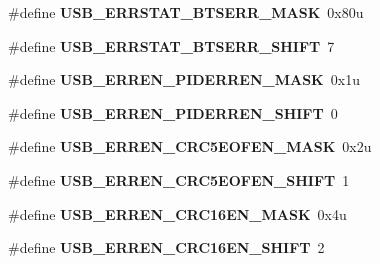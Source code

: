 \begin{DoxyCompactItemize}
\item 
\#define {\bfseries U\+S\+B\+\_\+\+E\+R\+R\+S\+T\+A\+T\+\_\+\+B\+T\+S\+E\+R\+R\+\_\+\+M\+A\+SK}~0x80u\hypertarget{group__USB__Register__Masks_ga9cfa1a07c56005e5d545ecf363c4e916}{}\label{group__USB__Register__Masks_ga9cfa1a07c56005e5d545ecf363c4e916}

\item 
\#define {\bfseries U\+S\+B\+\_\+\+E\+R\+R\+S\+T\+A\+T\+\_\+\+B\+T\+S\+E\+R\+R\+\_\+\+S\+H\+I\+FT}~7\hypertarget{group__USB__Register__Masks_ga4827905bfe176b3ba2992ce3ff9a4575}{}\label{group__USB__Register__Masks_ga4827905bfe176b3ba2992ce3ff9a4575}

\item 
\#define {\bfseries U\+S\+B\+\_\+\+E\+R\+R\+E\+N\+\_\+\+P\+I\+D\+E\+R\+R\+E\+N\+\_\+\+M\+A\+SK}~0x1u\hypertarget{group__USB__Register__Masks_ga971e0d8939196ec3990a73b4db4030ad}{}\label{group__USB__Register__Masks_ga971e0d8939196ec3990a73b4db4030ad}

\item 
\#define {\bfseries U\+S\+B\+\_\+\+E\+R\+R\+E\+N\+\_\+\+P\+I\+D\+E\+R\+R\+E\+N\+\_\+\+S\+H\+I\+FT}~0\hypertarget{group__USB__Register__Masks_ga47a2a895b1b94a32aa482d11173e2fb9}{}\label{group__USB__Register__Masks_ga47a2a895b1b94a32aa482d11173e2fb9}

\item 
\#define {\bfseries U\+S\+B\+\_\+\+E\+R\+R\+E\+N\+\_\+\+C\+R\+C5\+E\+O\+F\+E\+N\+\_\+\+M\+A\+SK}~0x2u\hypertarget{group__USB__Register__Masks_gafab72bb1aedf0d529c720a25d6ee93da}{}\label{group__USB__Register__Masks_gafab72bb1aedf0d529c720a25d6ee93da}

\item 
\#define {\bfseries U\+S\+B\+\_\+\+E\+R\+R\+E\+N\+\_\+\+C\+R\+C5\+E\+O\+F\+E\+N\+\_\+\+S\+H\+I\+FT}~1\hypertarget{group__USB__Register__Masks_gafc8288624f2373be283f408a290f3daf}{}\label{group__USB__Register__Masks_gafc8288624f2373be283f408a290f3daf}

\item 
\#define {\bfseries U\+S\+B\+\_\+\+E\+R\+R\+E\+N\+\_\+\+C\+R\+C16\+E\+N\+\_\+\+M\+A\+SK}~0x4u\hypertarget{group__USB__Register__Masks_gae216c42729f6b3d992001136744fe341}{}\label{group__USB__Register__Masks_gae216c42729f6b3d992001136744fe341}

\item 
\#define {\bfseries U\+S\+B\+\_\+\+E\+R\+R\+E\+N\+\_\+\+C\+R\+C16\+E\+N\+\_\+\+S\+H\+I\+FT}~2\hypertarget{group__USB__Register__Masks_ga7d910c7016807387969de45f0ac3e2d6}{}\label{group__USB__Register__Masks_ga7d910c7016807387969de45f0ac3e2d6}


\end{DoxyCompactItemize}
